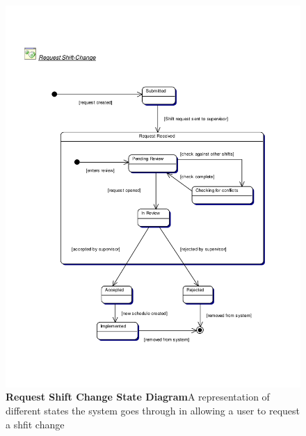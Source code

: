 \documentclass[letterpaper,12pt]{report}
\begin{document}
\newpage
\begin{figure}[htp]
 \includegraphics[scale=0.7,trim=20mm 20mm 25mm 30mm]{diagrams/ad_reqshift.pdf}
 \caption{\small
\textbf{Request Shift Change State Diagram}\newline A representation of different states the system goes through in allowing a user to request a shfit change}\label{fig:state2}
\end{figure}
\newpage
\end{document}
